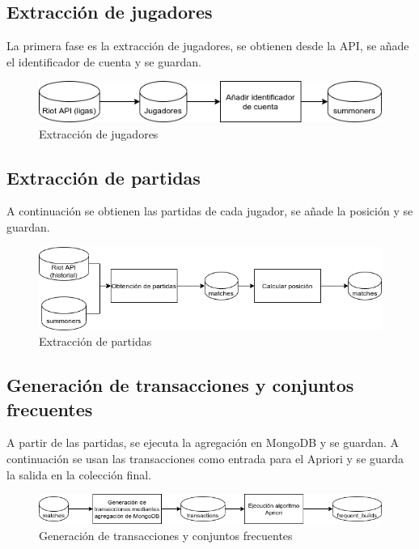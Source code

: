 \subsection{Extracción de jugadores}
La primera fase es la extracción de jugadores, se obtienen desde la API, se añade el identificador de cuenta y se guardan.
\begin{figure}[h]
	\centering
	\includegraphics[width=1\linewidth]{img/diag-summoners}
	\caption{Extracción de jugadores}
	\label{fig:diag-summoners}
\end{figure}

\subsection{Extracción de partidas}
A continuación se obtienen las partidas de cada jugador, se añade la posición y se guardan.
\begin{figure}[h]
	\centering
	\includegraphics[width=1\linewidth]{img/diag-matches}
	\caption{Extracción de partidas}
	\label{fig:diag-matches}
\end{figure}

\subsection{Generación de transacciones y conjuntos frecuentes}
A partir de las partidas, se ejecuta la agregación en MongoDB y se guardan. A continuación se usan las transacciones como entrada para el Apriori y se guarda la salida en la colección final.
\begin{figure}[h]
	\centering
	\includegraphics[width=1\linewidth]{img/diag-transform}
	\caption{Generación de transacciones y conjuntos frecuentes}
	\label{fig:diag-matches}
\end{figure}